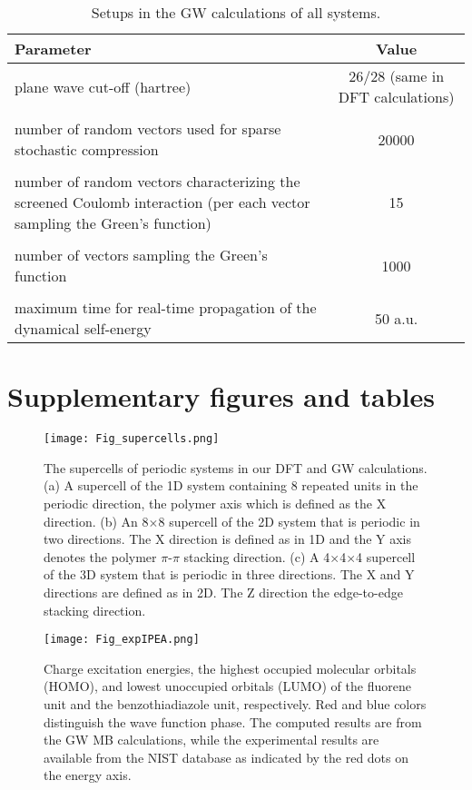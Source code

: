 \documentclass[journal = jpclcd]{achemso}
\begin{document}
\begin{table}[H]
\centering
\begin{tabular}{p{}|c}
Parameter                             & Value                            \\ \hline
plane wave cut-off (hartree)                      & 26/28 (same in DFT calculations) \\
& \\
number of random vectors used for sparse stochastic compression           & 20000 \\
& \\
number of random vectors characterizing the screened Coulomb interaction (per each vector sampling the Green's function) & 15\\
& \\
number of vectors sampling the Green's function & 1000\\
& \\
maximum time for real-time propagation of the dynamical self-energy              & 50 a.u.                           
\end{tabular}
\caption{Setups in the GW calculations of all systems.}
\label{tab:GWsetups}
\end{table}

\section{Supplementary figures and tables}
\begin{figure}[H]
    \centering
    \texttt{[image: Fig\_supercells.png]}
    \caption{The supercells of periodic systems in our DFT and GW calculations. (a) A supercell of the 1D system containing 8 repeated units in the periodic direction, the polymer axis which is defined as the X direction. (b) An 8$\times$8 supercell of the 2D system that is periodic in two directions. The X direction is defined as in 1D and the Y axis denotes the polymer $\pi$-$\pi$ stacking direction. (c) A 4$\times$4$\times$4 supercell of the 3D system that is periodic in three directions. The X and Y directions are defined as in 2D. The Z direction the edge-to-edge stacking direction.} 
    \label{Fig_supercells}
\end{figure}



\begin{figure}[H]
    \centering
    \texttt{[image: Fig\_expIPEA.png]}
    \caption{Charge excitation energies, the highest occupied molecular orbitals (HOMO), and lowest unoccupied orbitals (LUMO) of the fluorene unit and the benzothiadiazole unit, respectively. Red and blue colors distinguish the wave function phase. The computed results are from the GW MB calculations, while the experimental results are available from the NIST database as indicated by the red dots on the energy axis.}  
    \label{Fig_IPEA}
\end{figure}
\end{document}
